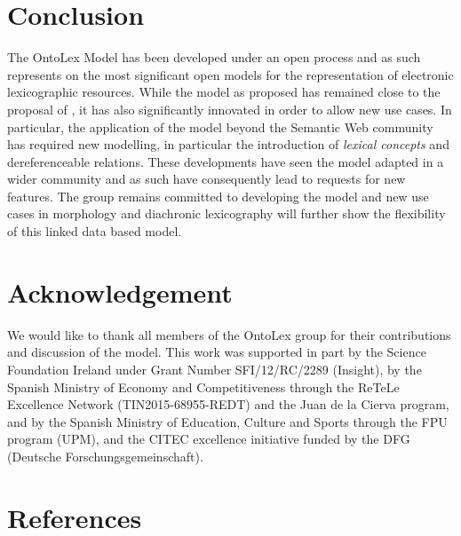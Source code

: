 \documentclass[12pt,a4paper]{elex2017}
\begin{document}
\section{Conclusion}

The OntoLex Model has been developed under an open process and as such
represents on the most significant open models for the representation of
electronic lexicographic resources. While the model as proposed has remained
close to the proposal of \cite{mccrae2012interchanging}, it has also
significantly innovated in order to allow new use cases. In particular, the
application of the model beyond the Semantic Web community has required new
modelling, in particular the introduction of \emph{lexical concepts} and
dereferenceable relations. These developments have seen the model adapted in a
wider community and as such have consequently lead to requests for new features.
The group remains committed to developing the model and new use cases in
morphology and diachronic lexicography will further show the flexibility of this
linked data based model.

\section*{Acknowledgement} 

We would like to thank all members of the OntoLex group for their contributions
and discussion of the model. This work was supported in part by the Science Foundation Ireland under Grant
Number SFI/12/RC/2289 (Insight), by the Spanish Ministry of Economy and 
Competitiveness through the ReTeLe Excellence Network (TIN2015-68955-REDT)
 and the Juan de la Cierva program, and by the Spanish Ministry of Education, 
 Culture and Sports through the FPU program (UPM), and the CITEC excellence
 initiative funded by the DFG (Deutsche
 Forschungsgemeinschaft).

\section*{References}

\printbibliography[
    type={book},
    notkeyword={dictionary},
    title={Books}
]
\printbibliography[
    type={incollection},
    title={Book Sections}
]
\printbibliography[
    type={inproceedings},
    title={Paper in conference proceedings}
]
\printbibliography[
    type={article},
    title={Journal Articles}
]
\printbibliography[
    type={misc},
    title={Technical Reports}
]
\printbibliography[
    type={book},
    keyword={dictionary},
    title={Dictionaries}
]
\end{document}

